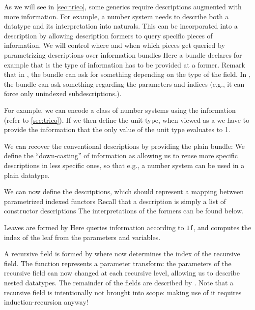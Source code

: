 As we will see in \autoref{sec:trieo}, some generics require descriptions augmented with more information. For example, a number system needs to describe both a datatype and its interpretation into naturals. This can be incorporated into a description by allowing description formers to query specific pieces of information. We will control where and when which pieces get queried by parametrizing descriptions over information bundles  
Here a bundle declares for example that  is the type of information has to be provided at a  former. Remark that in , the bundle can ask for something depending on the type of the field. In , the bundle can ask something regarding the parameters and indices (e.g., it can force only unindexed subdescriptions.).

\begin{example}
    For example, we can encode a class of number systems using the information 
    (refer to \autoref{sec:trieo}). If we then define the unit type, when viewed as a 
    we have to provide the information that the only value of the unit type evaluates to 1.
\end{example}

We can recover the conventional descriptions by providing the plain bundle:
We define the ``down-casting'' of information as
allowing us to reuse more specific descriptions in less specific ones, so that e.g., a number system can be used in a plain datatype.

We can now define the descriptions, which should represent a mapping between parametrized indexed functors
Recall that a description 
is simply a list of constructor descriptions
The interpretations \hyperlink{desc-desc-interpretation}{} of the formers can be found below.

Leaves are formed by
Here  queries information according to \texttt{If}, and  computes the index of the leaf from the parameters and variables.

A recursive field is formed by
where  now determines the index of the recursive field. The function  represents a parameter transform: the parameters of the recursive field can now changed at each recursive level, allowing us to describe nested datatypes. The remainder of the fields are described by . Note that a recursive field is intentionally not brought into scope: making use of it requires induction-recursion anyway!

